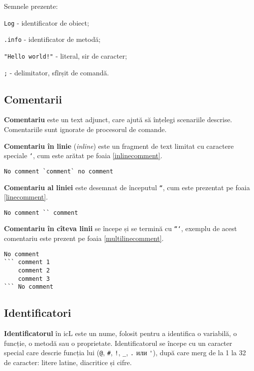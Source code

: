 Semnele prezente:
\begin{icItems}
\item
	\lstinline`Log` - identificator de obiect;
\item
	\lstinline`.info` - identificator de metodă;
\item
	\lstinline`"Hello world!"` - literal, sir de caracter;
\item
	\lstinline`;` - delimitator, sfîrșit de comandă.
\end{icItems}

\subsection{Comentarii}

\textbf{Comentariu} este un text adjunct, care ajută să înțelegi scenariile descrise. Comentariile sunt ignorate de procesorul de comande.

\textbf{Comentariu în linie} (\textit{inline}) este un fragment de text limitat cu caractere speciale \texttt{`}, cum este arătat pe foaia \ref{inlinecomment}.

\begin{lstlisting}[caption=Comentariu în linie,label=inlinecomment]
No comment `comment` no comment
\end{lstlisting}

\textbf{Comentariu al liniei} este desemnat de începutul \texttt{``}, cum este prezentat pe foaia \ref{linecomment}.

\begin{lstlisting}[caption=Comentariu al liniei,label=linecomment]
No comment `` comment
\end{lstlisting}

\textbf{Comentariu în cîteva linii} se începe și se termină cu \texttt{```}, exemplu de acest comentariu este prezent pe foaia \ref{multilinecomment}.

\begin{lstlisting}[caption=Comentariu în cîteva linii,label=multilinecomment]
No comment
``` comment 1
	comment 2
	comment 3
``` No comment
\end{lstlisting}

\subsection{Identificatori}

\textbf{Identificatorul} în icL este un nume, folosit pentru a identifica o variabilă, o funcție, o metodă sau o proprietate. Identificatorul se începe cu un caracter special care descrie funcția lui (\lstinline`@`, \lstinline`#`, \lstinline`!`, \lstinline`_`, \lstinline`.` или \lstinline`'`), după care merg de la 1 la 32 de caracter: litere latine, diacritice și cifre.

